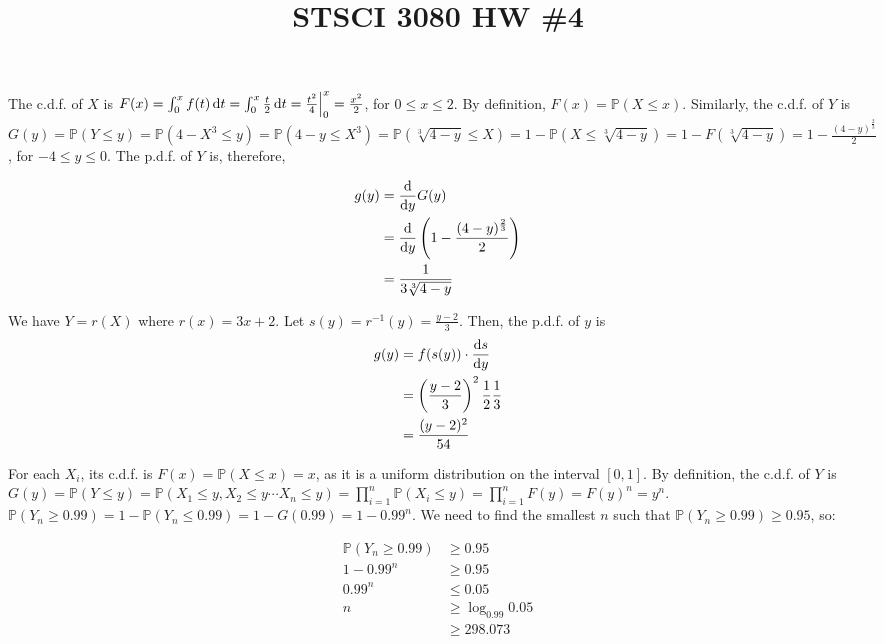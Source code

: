 

\title{STSCI 3080 HW \#4}
\author{\name}
\maketitle

The c.d.f. of $X$ is $F(x) = \int_0^x f(t) \mathop{}\!\mathrm{d} t = \int_0^x \frac{t}{2} \mathop{}\!\mathrm{d} t = \frac{t^2}{4}\Big|_0^x = \frac{x^2}{2}$, for $0 \leq x \leq 2$. By definition, $F(x) = \mathbb{P}(X \leq x)$. Similarly, the c.d.f. of $Y$ is $G(y) = \mathbb{P}(Y \leq y) = \mathbb{P}(4 - X^3 \leq y) = \mathbb{P}(4 - y \leq X^3) = \mathbb{P}(\sqrt[3]{4 - y} \leq X) = 1 - \mathbb{P}(X \leq \sqrt[3]{4 - y}) = 1 - F(\sqrt[3]{4 - y}) = 1 - \frac{(4 - y)^{\frac{2}{3}}}{2}$, for $-4 \leq y \leq 0$. The p.d.f. of $Y$ is, therefore,

\begin{align*}
  g(y) &= \frac{\mathop{}\!\mathrm{d}}{\mathop{}\!\mathrm{d} y} G(y) \\
  &= \frac{\mathop{}\!\mathrm{d}}{\mathop{}\!\mathrm{d} y} \left(1 - \frac{(4 - y)^{\frac{2}{3}}}{2}\right) \\
  &= \frac{1}{3\sqrt[3]{4 - y}}
\end{align*}

We have $Y = r(X)$ where $r(x) = 3x + 2$. Let $s(y) = r^{-1}(y) = \frac{y - 2}{3}$. Then, the p.d.f. of $y$ is
\begin{align*}
  g(y) &= f(s(y)) \cdot \frac{\mathop{}\!\mathrm{d} s}{\mathop{}\!\mathrm{d} y} \\
  &= \left(\frac{y - 2}{3}\right)^2 \frac{1}{2} \frac{1}{3} \\
  &= \frac{(y - 2)^2}{54}
\end{align*}

For each $X_i$, its c.d.f. is $F(x) = \mathbb{P}(X \leq x) = x$, as it is a uniform distribution on the interval $[0, 1]$. By definition, the c.d.f. of $Y$ is $G(y) = \mathbb{P}(Y \leq y) = \mathbb{P}(X_1 \leq y, X_2 \leq y \cdots X_n \leq y) = \prod_{i = 1}^n \mathbb{P}(X_i \leq y) = \prod_{i = 1}^n F(y) = F(y)^n = y^n$. $\mathbb{P}(Y_n \geq 0.99) = 1 - \mathbb{P}(Y_n \leq 0.99) = 1 - G(0.99) = 1 - 0.99^n$. We need to find the smallest $n$ such that $\mathbb{P}(Y_n \geq 0.99) \geq 0.95$, so:

\begin{align*}
  \mathbb{P}(Y_n \geq 0.99) &\geq 0.95 \\
  1 - 0.99^n &\geq 0.95 \\
  0.99^n &\leq 0.05 \\
  n &\geq \log_{0.99}{0.05} \\
  &\geq 298.073
\end{align*}

